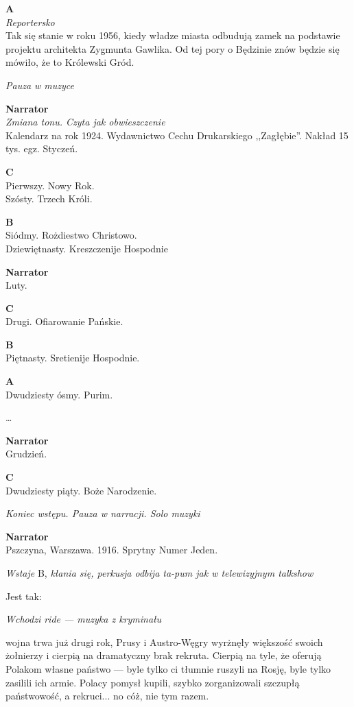 \documentclass[11pt,a4paper,oneside]{article}
\begin{document}
\textbf{A}\\
{\color{light-gray} \emph{Reportersko}}\\
Tak się stanie w roku 1956, kiedy władze miasta odbudują zamek na podstawie
projektu architekta Zygmunta Gawlika. Od tej pory o Będzinie znów będzie się
mówiło, że to Królewski Gród.

{\color{light-gray} \emph{Pauza w muzyce}}

\textbf{Narrator}\\
{\color{light-gray} \emph{Zmiana tonu. Czyta jak obwieszczenie}}\\
Kalendarz na rok 1924. Wydawnictwo Cechu Drukarskiego
,,Zagłębie''. Nakład 15 tys. egz. Styczeń.

\textbf{C}\\
Pierwszy. Nowy Rok. \\
Szósty. Trzech Króli.

\textbf{B}\\
Siódmy. Rożdiestwo Christowo. \\
Dziewiętnasty. Kreszczenije Hospodnie

\textbf{Narrator}\\
Luty.

\textbf{C}\\
Drugi. Ofiarowanie Pańskie.

\textbf{B}\\
Piętnasty. Sretienije Hospodnie.

\textbf{A}\\
Dwudziesty ósmy. Purim.

\dots{}

\textbf{Narrator}\\
Grudzień.

\textbf{C}\\
Dwudziesty piąty. Boże Narodzenie.

{\color{light-gray} \emph{Koniec wstępu. Pauza w narracji. Solo muzyki}}

\textbf{Narrator}\\
Pszczyna, Warszawa. 1916. Sprytny Numer Jeden. 

{\color{light-gray} \emph{Wstaje} B, \emph{kłania się, perkusja odbija
ta-pum jak w telewizyjnym talkshow}}

Jest tak: 

{\color{light-gray} \emph{Wchodzi ride --- muzyka z kryminału}}

wojna trwa już drugi rok, Prusy i Austro-Węgry wyrżnęły większość
swoich żołnierzy i cierpią na dramatyczny brak rekruta. Cierpią na
tyle, że oferują Polakom własne państwo --- byle tylko ci tłumnie ruszyli na
Rosję, byle tylko zasilili ich armie. Polacy pomysł kupili, szybko 
zorganizowali szczupłą państwowość, a rekruci... no cóż, nie tym razem.
\end{document}
